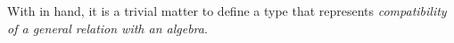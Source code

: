 With  in hand, it is a trivial matter to define a type that represents \emph{compatibility of a general relation with an algebra}.
\ccpad
\begin{code}%
\>[1]\AgdaSpace{}%
\AgdaSymbol{:}\AgdaSpace{}%
\AgdaSpace{}%
\AgdaSpace{}%
\AgdaSpace{}%
\AgdaSpace{}%
\AgdaSpace{}%
\AgdaSpace{}%
\AgdaSpace{}%
\AgdaSpace{}%
\AgdaSpace{}%
\AgdaSpace{}%
\AgdaSpace{}%
\AgdaSpace{}%
\AgdaSpace{}%
\AgdaSpace{}%
\<%
\\
%
\>[1]\AgdaSpace{}%
\AgdaSpace{}%
\AgdaSymbol{=}\AgdaSpace{}%
\AgdaSpace{}%
\AgdaSymbol{(}\AgdaSpace{}%
\AgdaSymbol{:}\AgdaSpace{}%
\AgdaSpace{}%
\AgdaSpace{}%
\AgdaSpace{}%
\AgdaSymbol{)}\AgdaSpace{}%
\AgdaSpace{}%
\AgdaSpace{}%
\AgdaSpace{}%
\<%
\end{code}
\ccpad

